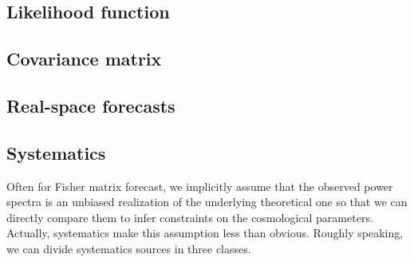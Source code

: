 \subsection{Likelihood function}


\subsection{Covariance matrix}


\subsection{Real-space forecasts}


\subsection{Systematics}

Often for Fisher matrix forecast, we implicitly assume that the observed power spectra
is an unbiased realization of the underlying theoretical one so that we can
directly compare them to infer constraints on the cosmological parameters.
Actually, systematics make this assumption less than obvious. Roughly speaking,
we can divide systematics sources in three classes.



